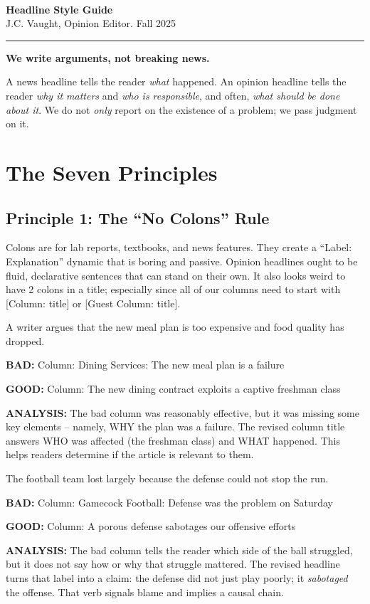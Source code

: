 \documentclass[12pt]{article}
\newcommand{\bad}[1]{\textbf{\textcolor{rose}{BAD:}} #1}
\newcommand{\good}[1]{\textbf{\textcolor{congaree}{GOOD:}} #1}
\newcommand{\context}[1]{#1}
\newcommand{\doctitle}{%
    \noindent{\LARGE\bfseries The Daily Gamecock \textit{Opinion}}\\[2pt]
    {\LARGE\bfseries Headline Style Guide}\\[4pt]
    {\normalsize J.C. Vaught, Opinion Editor. Fall 2025}\\[-2pt]
    \noindent\rule{\textwidth}{1pt}
    \vspace{8pt}
}
\begin{document}
\thispagestyle{plain}

\doctitle

\begin{principalbox}
\textbf{We write arguments, not breaking news.}

A news headline tells the reader \textit{what} happened. An opinion headline tells the reader \textit{why it matters} and \textit{who is responsible}, and often, \textit{what should be done about it}. We do not \textit{only} report on the existence of a problem; we pass judgment on it.
\end{principalbox}

\section{The Seven Principles}

\subsection{Principle 1: The ``No Colons'' Rule}
Colons are for lab reports, textbooks, and news features. They create a ``Label: Explanation'' dynamic that is boring and passive. Opinion headlines ought to be fluid, declarative sentences that can stand on their own. It also looks weird to have 2 colons in a title; especially since all of our columns need to start with [Column: title] or [Guest Column: title].

\begin{exampleblock}
\context{A writer argues that the new meal plan is too expensive and food quality has dropped.}

\bad{Column: Dining Services: The new meal plan is a failure}

\good{Column: The new dining contract exploits a captive freshman class}

\textbf{ANALYSIS:} The bad column was reasonably effective, but it was missing some key elements -- namely, WHY the plan was a failure. The revised column title answers WHO was affected (the freshman class) and WHAT happened. This helps readers determine if the article is relevant to them.
\end{exampleblock}

\begin{exampleblock}
\context{The football team lost largely because the defense could not stop the run.}

\bad{Column: Gamecock Football: Defense was the problem on Saturday}

\good{Column: A porous defense sabotages our offensive efforts}

\textbf{ANALYSIS:} The bad column tells the reader which side of the ball struggled, but it does not say how or why that struggle mattered. The revised headline turns that label into a claim: the defense did not just play poorly; it \textit{sabotaged} the offense. That verb signals blame and implies a causal chain.
\end{exampleblock}
\end{document}
